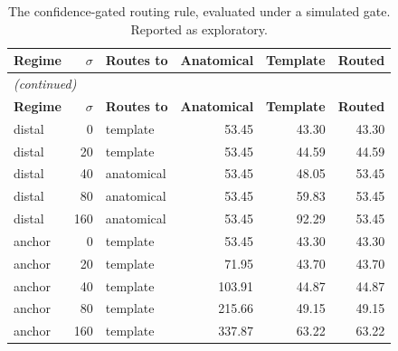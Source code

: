 \begin{center}
{\fontsize{10}{12}\selectfont
\begin{longtable}{lrlrrr}
\caption{The confidence-gated routing rule, evaluated under a simulated gate. Reported as exploratory.}\label{tab:appselection}\\
\hline
\textbf{Regime} & \textbf{$\sigma$} & \textbf{Routes to} & \textbf{Anatomical} & \textbf{Template} & \textbf{Routed} \\
\hline
\endfirsthead
\multicolumn{6}{l}{\textit{(continued)}}\\
\hline
\textbf{Regime} & \textbf{$\sigma$} & \textbf{Routes to} & \textbf{Anatomical} & \textbf{Template} & \textbf{Routed} \\
\hline
\endhead
\hline
\endfoot
distal & 0 & template & 53.45 & 43.30 & 43.30 \\
distal & 20 & template & 53.45 & 44.59 & 44.59 \\
distal & 40 & anatomical & 53.45 & 48.05 & 53.45 \\
distal & 80 & anatomical & 53.45 & 59.83 & 53.45 \\
distal & 160 & anatomical & 53.45 & 92.29 & 53.45 \\
anchor & 0 & template & 53.45 & 43.30 & 43.30 \\
anchor & 20 & template & 71.95 & 43.70 & 43.70 \\
anchor & 40 & template & 103.91 & 44.87 & 44.87 \\
anchor & 80 & template & 215.66 & 49.15 & 49.15 \\
anchor & 160 & template & 337.87 & 63.22 & 63.22 \\
\end{longtable}
}
\end{center}
